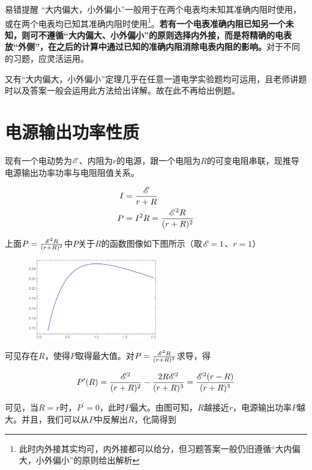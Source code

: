 \begin{mk}{易错提醒}{}
“大内偏大，小外偏小”一般用于在两个电表均未知其准确内阻时使用，或在两个电表均已知其准确内阻时使用\footnote{此时内外接其实均可，内外接都可以给分，但习题答案一般仍旧遵循“大内偏大，小外偏小”的原则给出解析}。\textbf{若有一个电表准确内阻已知另一个未知，则可不遵循“大内偏大、小外偏小”的原则选择内外接，而是将精确的电表放“外侧”，在之后的计算中通过已知的准确内阻消除电表内阻的影响。}对于不同的习题，应灵活运用。
\end{mk}

又有“大内偏大，小外偏小”定理几乎在任意一道电学实验题均可运用，且老师讲题时以及答案一般会运用此方法给出详解。故在此不再给出例题。

\section{电源输出功率性质}
\label{s_wdlzdgl}

现有一个电动势为$\mathscr{E}$、内阻为$r$的电源，跟一个电阻为$R$的可变电阻串联，现推导电源输出功率功率与电阻阻值关系。

\begin{subequations}
\begin{align*}
I &= \frac{\mathscr{E}}{r + R} \\
P &= I^2 R = \frac{\mathscr{E}^2 R}{(r + R)^2}
\end{align*}
\end{subequations}

上面$P = \frac{\mathscr{E}^2 R}{(r + R)^2}$中$P$关于$R$的函数图像如下图所示（取$\mathscr{E} = 1$、$r = 1$）

\begin{figure}[htbp]
\centering
\includegraphics[width=0.5\textwidth]{pic_eled/zdgl_p1.pdf}
\end{figure}

可见存在$R$，使得$P$取得最大值。对$P = \frac{\mathscr{E}^2 R}{(r + R)^2}$求导，得

$$P^{\prime}(R) = \frac{\mathscr{E}^2}{(r+R)^2}-\frac{2 R \mathscr{E}^2}{(r+R)^3} = \frac{\mathscr{E}^2 (r-R)}{(r+R)^3}$$

可见，当$R=r$时，$P^{\prime} = 0$，此时$P$最大。由图可知，$R$越接近$r$，电源输出功率$P$越大。并且，我们可以从$P$中反解出$R$，化简得到

